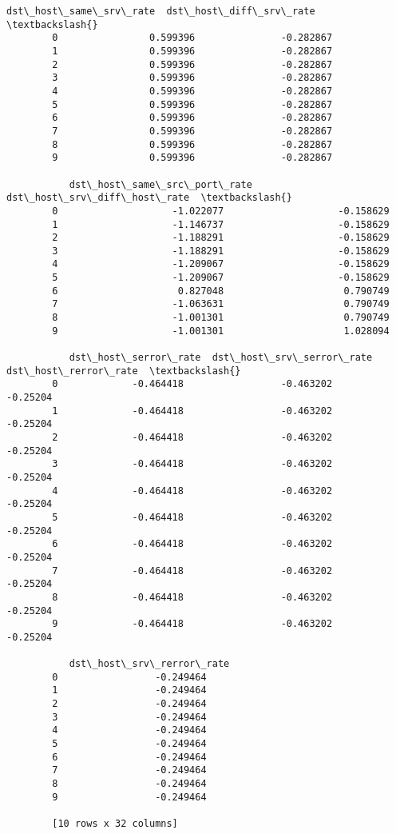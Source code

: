 \documentclass[11pt]{article}
\begin{document}
\begin{Verbatim}[commandchars=\\\{\}]
           dst\_host\_same\_srv\_rate  dst\_host\_diff\_srv\_rate  \textbackslash{}
        0                0.599396               -0.282867   
        1                0.599396               -0.282867   
        2                0.599396               -0.282867   
        3                0.599396               -0.282867   
        4                0.599396               -0.282867   
        5                0.599396               -0.282867   
        6                0.599396               -0.282867   
        7                0.599396               -0.282867   
        8                0.599396               -0.282867   
        9                0.599396               -0.282867   
        
           dst\_host\_same\_src\_port\_rate  dst\_host\_srv\_diff\_host\_rate  \textbackslash{}
        0                    -1.022077                    -0.158629   
        1                    -1.146737                    -0.158629   
        2                    -1.188291                    -0.158629   
        3                    -1.188291                    -0.158629   
        4                    -1.209067                    -0.158629   
        5                    -1.209067                    -0.158629   
        6                     0.827048                     0.790749   
        7                    -1.063631                     0.790749   
        8                    -1.001301                     0.790749   
        9                    -1.001301                     1.028094   
        
           dst\_host\_serror\_rate  dst\_host\_srv\_serror\_rate  dst\_host\_rerror\_rate  \textbackslash{}
        0             -0.464418                 -0.463202              -0.25204   
        1             -0.464418                 -0.463202              -0.25204   
        2             -0.464418                 -0.463202              -0.25204   
        3             -0.464418                 -0.463202              -0.25204   
        4             -0.464418                 -0.463202              -0.25204   
        5             -0.464418                 -0.463202              -0.25204   
        6             -0.464418                 -0.463202              -0.25204   
        7             -0.464418                 -0.463202              -0.25204   
        8             -0.464418                 -0.463202              -0.25204   
        9             -0.464418                 -0.463202              -0.25204   
        
           dst\_host\_srv\_rerror\_rate  
        0                 -0.249464  
        1                 -0.249464  
        2                 -0.249464  
        3                 -0.249464  
        4                 -0.249464  
        5                 -0.249464  
        6                 -0.249464  
        7                 -0.249464  
        8                 -0.249464  
        9                 -0.249464  
        
        [10 rows x 32 columns]
\end{Verbatim}
            
\end{document}
